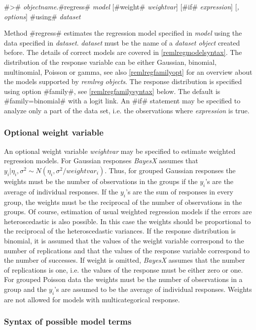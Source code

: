  #># {\em objectname}.#regress# {\em model} [#weight# {\em weightvar}] [#if# {\em expression}] [{\em , options}] #using# {\em dataset}

Method #regress# estimates the regression model specified in {\em
model} using the data specified in {\em dataset}. {\em dataset}
must be the name of a {\em dataset object} created before. The
details of correct models are covered in
\autoref{remlregmodelsyntax}. The distribution of the response
variable can be either Gaussian, binomial, multinomial, Poisson or
gamma, see also \autoref{remlregfamilyopt} for an overview about
the models supported by {\em remlreg objects}. The response
distribution is specified using option #family#, see
\autoref{remlregfamilysyntax} below. The default is
#family=binomial# with a logit link. An #if# statement may be
specified to analyze only a part of the data set, i.e. the
observations where {\em expression} is true.

\subsubsection{Optional weight variable }
\label{remlregweightspecification}

An optional weight variable {\em weightvar} may be specified to
estimate weighted regression models. For Gaussian responses {\em
BayesX} assumes that $y_i|\eta_i,\sigma^2 \sim
N(\eta_i,\sigma^2/weightvar_i)$. Thus, for grouped Gaussian
responses the weights must be the number of observations in the
groups if the $y_i$'s are the average of individual responses. If
the $y_i$'s are the sum of responses in every group, the weights
must be the reciprocal of the number of observations in the
groups. Of course, estimation of usual weighted regression models
if the errors are heteroscedastic is also possible. In this case
the weights should be proportional to the reciprocal of the
heteroscedastic variances. If the response distribution is
binomial, it is assumed that the values of the weight variable
correspond to the number of replications and that the values of
the response variable correspond to the number of successes. If
weight is omitted, {\em BayesX} assumes that the number of
replications is one, i.e. the values of the response must be
either zero or one. For grouped Poisson data the weights must be
the number of observations in a group and the $y_i$'s are assumed
to be the average of individual responses. Weights are not allowed
for models with multicategorical response.

\subsubsection{Syntax of possible model terms}
\label{remlregmodelsyntax}

